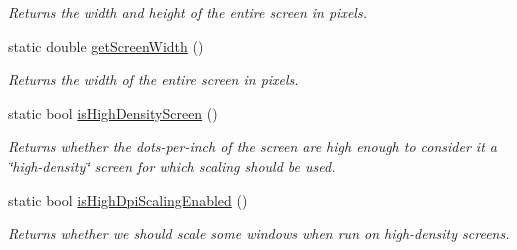 \begin{DoxyCompactItemize}
\begin{DoxyCompactList}\small\item\em Returns the width and height of the entire screen in pixels. \end{DoxyCompactList}\item 
static double \mbox{\hyperlink{classGWindow_adc82933bd579ab83d7cd4e3bc5f79a12}{get\+Screen\+Width}} ()
\begin{DoxyCompactList}\small\item\em Returns the width of the entire screen in pixels. \end{DoxyCompactList}\item 
static bool \mbox{\hyperlink{classGWindow_a674ef3ad6e66d778e410e130cad47274}{is\+High\+Density\+Screen}} ()
\begin{DoxyCompactList}\small\item\em Returns whether the dots-\/per-\/inch of the screen are high enough to consider it a \char`\"{}high-\/density\char`\"{} screen for which scaling should be used. \end{DoxyCompactList}\item 
static bool \mbox{\hyperlink{classGWindow_a040690336154a3f414001a16ffdb947e}{is\+High\+Dpi\+Scaling\+Enabled}} ()
\begin{DoxyCompactList}\small\item\em Returns whether we should scale some windows when run on high-\/density screens. \end{DoxyCompactList}\end{DoxyCompactItemize}
